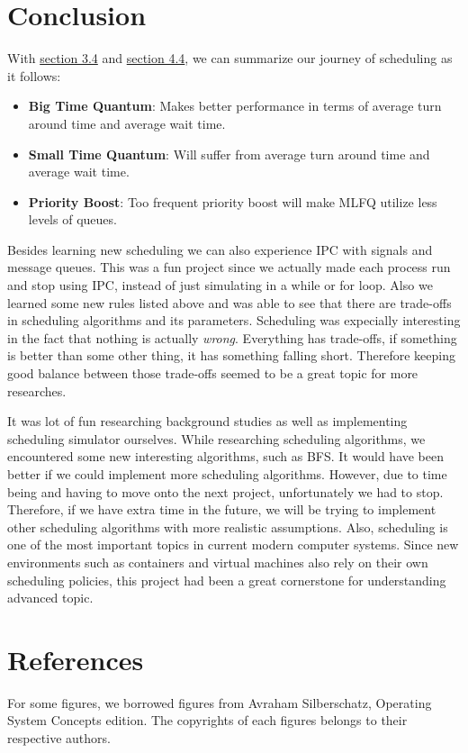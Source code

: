 \documentclass{homework}
\begin{document}
\section{Conclusion}
With \hyperref[sec:rrconclusion]{section 3.4} and \hyperref[sec:mlfqconclusion]{section 4.4}, we can summarize our journey of scheduling as it follows:
\begin{itemize}
    \item \textbf{Big Time Quantum}: Makes better performance in terms of average turn around time and average wait time.
    \item \textbf{Small Time Quantum}: Will suffer from average turn around time and average wait time.
    \item \textbf{Priority Boost}: Too frequent priority boost will make MLFQ utilize less levels of queues.
\end{itemize}
Besides learning new scheduling we can also experience IPC with signals and message queues. This was a fun project since we actually made each process run and stop using IPC, instead of just simulating in a while or for loop. Also we learned some new rules listed above and was able to see that there are trade-offs in scheduling algorithms and its parameters. Scheduling was expecially interesting in the fact that nothing is actually \textit{wrong}. Everything has trade-offs, if something is better than some other thing, it has something falling short. Therefore keeping good balance between those trade-offs seemed to be a great topic for more researches. 

It was lot of fun researching background studies as well as implementing scheduling simulator ourselves. While researching scheduling algorithms, we encountered some new interesting algorithms, such as BFS. It would have been better if we could implement more scheduling algorithms. However, due to time being and having to move onto the next project, unfortunately we had to stop. Therefore, if we have extra time in the future, we will be trying to implement other scheduling algorithms with more realistic assumptions. Also, scheduling is one of the most important topics in current modern computer systems. Since new environments such as containers and virtual machines also rely on their own scheduling policies, this project had been a great cornerstone for understanding advanced topic. 


\section{References}
For some figures, we borrowed figures from Avraham Silberschatz, Operating System Concepts  edition. The copyrights of each figures belongs to their respective authors.
\end{document}
